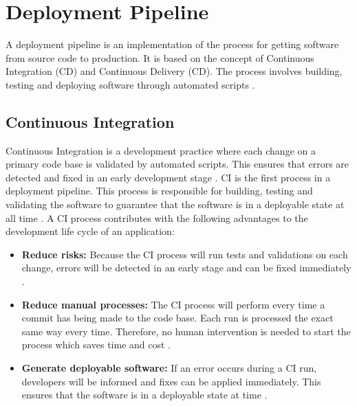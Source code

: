 \section{Deployment Pipeline}
A deployment pipeline is an implementation of the process for getting software from source code to production.
It is based on the concept of Continuous Integration (CD) and Continuous Delivery (CD).
The process involves building, testing and deploying software through automated scripts \cite{Farley2010CI}.






\subsection{Continuous Integration}
Continuous Integration is a development practice where each change on a primary code base is validated by automated scripts. This ensures that errors are detected and fixed in an early development stage \cite{Duvall2007CI}.
CI is the first process in a deployment pipeline.
This process is responsible for building, testing and validating the software to guarantee that the software is in a deployable state at all time \cite{Rossel2017CICD}.
A CI process contributes with the following advantages to the development life cycle of an application:
\begin{itemize}
\item \textbf{Reduce risks:}
Because the CI process will run tests and validations on each change, errors will be detected in an early stage and can be fixed immediately \cite{Duvall2007CI}.

\item \textbf{Reduce manual processes:} 
The CI process will perform every time a commit has being made to the code base.
Each run is processed the exact same way every time.
Therefore, no human intervention is needed to start the process which saves time and cost \cite{Duvall2007CI}.

\item \textbf{Generate deployable software:}
If an error occurs during a CI run, developers will be informed and fixes can be applied immediately.
This ensures that the software is in a deployable state at time \cite{Duvall2007CI}.
\end{itemize}


